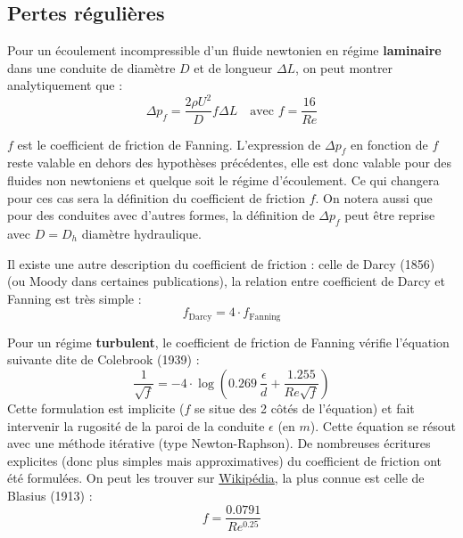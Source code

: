 \subsection{Pertes régulières}
%
\begin{center}
\end{center}
%
Pour un écoulement incompressible d'un fluide newtonien en régime \textbf{laminaire} dans une conduite de diamètre $D$ et de longueur $\Delta L$, on peut montrer analytiquement que :
%
\begin{equation}
    \Delta p_f = \frac{2\rho U^2}{D} f \Delta L
    \quad\text{avec } f = \frac{16}{Re}
\end{equation}

$f$ est le coefficient de friction de Fanning. L'expression de $\Delta p_f$ en fonction de $f$ reste valable en dehors des hypothèses précédentes, elle est donc valable pour des fluides non newtoniens et quelque soit le régime d'écoulement. Ce qui changera pour ces cas sera la définition du coefficient de friction $f$. On notera aussi que pour des conduites avec d'autres formes, la définition de $\Delta p_f$ peut être reprise avec $D = D_h$ diamètre hydraulique.

Il existe une autre description du coefficient de friction : celle de Darcy (1856) (ou Moody dans certaines publications), la relation entre coefficient de Darcy et Fanning est très simple :
%
\begin{equation}
    f_{\text{Darcy}} = 4\cdot f_{\text{Fanning}}
\end{equation}

Pour un régime \textbf{turbulent}, le coefficient de friction de Fanning vérifie l'équation suivante dite de Colebrook (1939) :
%
\begin{equation}
    \frac{1}{\sqrt{f}} = -4\cdot\log\left(0.269~\frac{\epsilon}{d} + \frac{1.255}{Re\sqrt{f}}\right)
\end{equation}
%
Cette formulation est implicite ($f$ se situe des 2 côtés de l'équation) et fait intervenir la rugosité de la paroi de la conduite $\epsilon$ (en $m$). Cette équation se résout avec une méthode itérative (type Newton-Raphson). De nombreuses écritures explicites (donc plus simples mais approximatives) du coefficient de friction ont été formulées. On peut les trouver sur \href{https://en.wikipedia.org/wiki/Darcy_friction_factor_formulae}{Wikipédia}, la plus connue est celle de Blasius (1913) :
%
\begin{equation}
    f = \frac{0.0791}{Re^{0.25}}
\end{equation}


